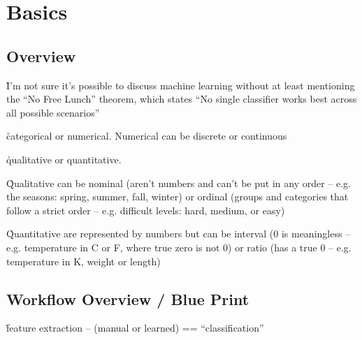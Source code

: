 \chapter{Basics}

\section{Overview}

\r{I'm not sure it's possible to discuss machine learning without at least mentioning the ``No Free Lunch'' theorem, which states ``No single classifier works best across all possible scenarios''~\cite{wolpert1997no}}


\r{categorical or numerical. Numerical can be discrete or continuous}

\r{qualitative or quantitative.} 

\r{Qualitative can be nominal (aren't numbers and can't be put in any order -- e.g. the seasons: spring, summer, fall, winter) or ordinal (groups and categories that follow a strict order -- e.g. difficult levels: hard, medium, or easy)}

\r{Quantitative are represented by numbers but can be interval (0 is meaningless -- e.g. temperature in C or F, where true zero is not 0) or ratio (has a true 0 -- e.g. temperature in K, weight or length)}

\section{Workflow Overview / Blue Print}

\r{feature extraction -- (manual or learned) == ``classification''}

